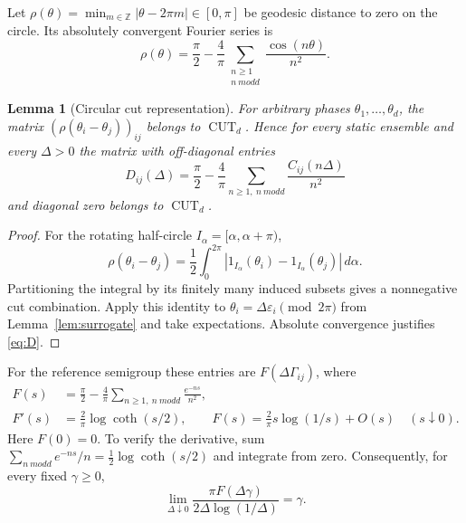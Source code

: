 \documentclass[11pt,a4paper]{article}
\newtheorem{lemma}[theorem]{Lemma}
\theoremstyle{remark}\newtheorem{remark}[theorem]{Remark}
\newcommand{\CUT}{\operatorname{CUT}}
\begin{document}
Let $\rho(\theta)=\min_{m\in\mathbb Z}|\theta-2\pi m|\in[0,\pi]$
be geodesic distance to zero on the circle. Its absolutely convergent
Fourier series is
\begin{equation}\label{eq:rho}
 \rho(\theta)=\frac\pi2-\frac4\pi
       \sum_{\substack{n\geq1\\n\ {
m odd}}}\frac{\cos(n\theta)}{n^2}.
\end{equation}

\begin{lemma}[Circular cut representation]\label{lem:circle}
For arbitrary phases $\theta_1,\ldots,\theta_d$, the matrix
$(\rho(\theta_i-\theta_j))_{ij}$ belongs to $\CUT_d$. Hence for every
static ensemble and every $\Delta>0$ the matrix with off-diagonal entries
\begin{equation}\label{eq:D}
 D_{ij}(\Delta)=\frac\pi2-\frac4\pi
  \sum_{n\geq1,\ n\ {
m odd}}\frac{C_{ij}(n\Delta)}{n^2}
\end{equation}
and diagonal zero belongs to $\CUT_d$.
\end{lemma}
\begin{proof}
For the rotating half-circle $I_\alpha=[\alpha,\alpha+\pi)$,
\[
 \rho(\theta_i-\theta_j)=\frac12\int_0^{2\pi}
  |1_{I_\alpha}(\theta_i)-1_{I_\alpha}(\theta_j)|\,d\alpha.
\]
Partitioning the integral by its finitely many induced subsets gives a
nonnegative cut combination. Apply this identity to
$\theta_i=\Delta\varepsilon_i\pmod{2\pi}$ from
Lemma~\ref{lem:surrogate} and take expectations.
Absolute convergence justifies \eqref{eq:D}.
\end{proof}

For the reference semigroup these entries are $F(\Delta\Gamma_{ij})$,
where
\begin{align}
 F(s)&=\frac\pi2-\frac4\pi\sum_{n\geq1,\ n\ {
m odd}}
                          \frac{e^{-ns}}{n^2},\label{eq:F}\\
 F'(s)&=\frac2\pi\log\coth(s/2),\qquad
 F(s)=\frac2\pi s\log(1/s)+O(s)\quad(s\downarrow0).\label{eq:Fasym}
\end{align}
Here $F(0)=0$. To verify the derivative, sum
$\sum_{n\ {
m odd}}e^{-ns}/n=\frac12\log\coth(s/2)$ and integrate
from zero. Consequently, for every fixed $\gamma\geq0$,
\begin{equation}\label{eq:ratelimit}
 \lim_{\Delta\downarrow0}\frac{\pi F(\Delta\gamma)}
                      {2\Delta\log(1/\Delta)}=\gamma.
\end{equation}
\end{document}
